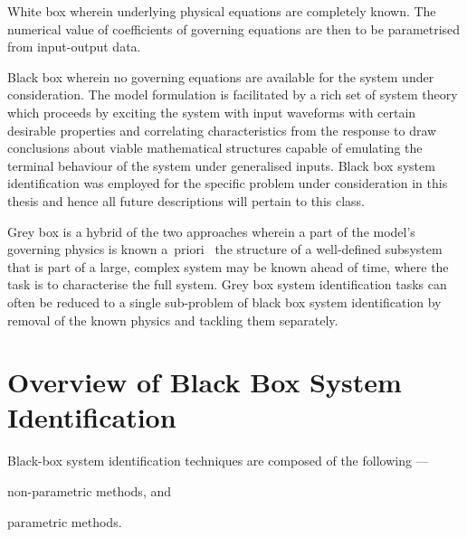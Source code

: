 \begin{enumdescriptnum}[leftmargin=!,itemsep=1ex,labelwidth=\widthof{$\symbf{\text{brugg}_j}\ \scriptstyle (\times 3)$abc}
    ,partopsep=0pt
    ,topsep=0pt
    ]

\item[White  box] wherein  underlying physical  equations are  completely known.
The  numerical value  of  coefficients of  governing equations  are  then to  be
parametrised from input-output data.

\item[Black box]  wherein no  governing equations are  available for  the system
under  consideration. The  model formulation  is facilitated  by a  rich set  of
system theory  which proceeds by exciting  the system with input  waveforms with
certain desirable  properties and correlating characteristics  from the response
to draw  conclusions about viable  mathematical structures capable  of emulating
the terminal behaviour of the system  under generalised inputs. Black box system
identification was employed for the specific problem under consideration in this
thesis and hence all future descriptions will pertain to this class.

\item[Grey box] is a hybrid of the  two approaches wherein a part of the model's
governing  physics is  known  a~priori  \eg~the  structure  of a  well-defined
subsystem  that is  part  of a  large,  complex  system may  be  known ahead  of
time,  where the  task  is  to characterise  the  full  system. Grey box  system
identification tasks can  often be reduced to a single  sub-problem of black box
system  identification  by  removal  of  the known  physics  and  tackling  them
separately.

\end{enumdescriptnum}

\section{Overview of Black Box System Identification}\label{sec:introblackboxsysid}

Black-box system identification techniques are composed of the following ---
\begin{enumerate*}[label=\emph{\alph*})]
     \item non-parametric methods, and
     \item parametric methods.
\end{enumerate*}

